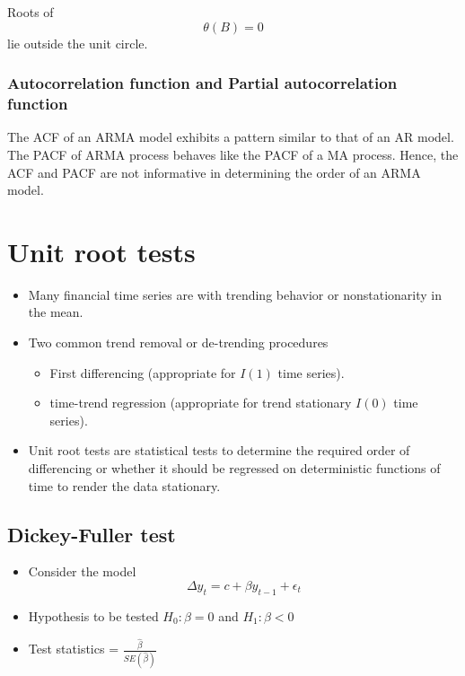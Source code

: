 \documentclass[]{book}
\providecommand{\tightlist}{%
  \setlength{\itemsep}{0pt}\setlength{\parskip}{0pt}}
\begin{document}
Roots of \[\theta(B)=0\] lie outside the unit circle.

\hypertarget{autocorrelation-function-and-partial-autocorrelation-function}{%
\subsubsection{Autocorrelation function and Partial autocorrelation function}\label{autocorrelation-function-and-partial-autocorrelation-function}}

The ACF of an ARMA model exhibits a pattern similar to that of an AR model. The PACF of ARMA process behaves like the PACF of a MA process. Hence, the ACF and PACF are not informative in determining the order of an ARMA model.

\newpage

\hypertarget{unit-root-tests}{%
\section{Unit root tests}\label{unit-root-tests}}

\begin{itemize}
\tightlist
\item
  Many financial time series are with trending behavior or nonstationarity in the mean.
\item
  Two common trend removal or de-trending procedures

  \begin{itemize}
  \tightlist
  \item
    First differencing (appropriate for \(I(1)\) time series).
  \item
    time-trend regression (appropriate for trend stationary
    \(I(0)\) time series).
  \end{itemize}
\item
  Unit root tests are statistical tests to determine the required order of differencing or whether it should be regressed on deterministic functions of time to render the data stationary.
\end{itemize}

\hypertarget{dickey-fuller-test}{%
\subsection{Dickey-Fuller test}\label{dickey-fuller-test}}

\begin{itemize}
\item
  Consider the model
  \[\Delta y_t = c+ \beta y_{t-1}+\epsilon_{t}\]
\item
  Hypothesis to be tested
  \(H_0: \beta = 0\) and \(H_1: \beta<0\)
\item
  Test statistics = \(\frac{\hat{\beta}}{SE(\hat{\beta})}\)
\end{itemize}
\end{document}
